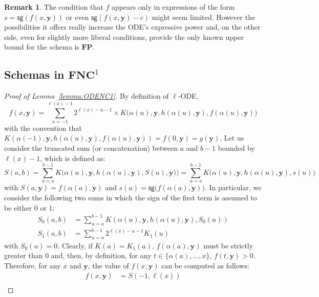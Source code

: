 \documentclass[11pt, oneside]{article}
\newcommand{\fun}[1]{\mathsf{#1}}
\newcommand{\FP}{\mathbf{FP}}
\newcommand{\NC}{\mathbf{FNC}}
\newcommand{\tu}[1]{\mathbf{#1}}
\theoremstyle{definition}
\newtheorem{remark}{Remark}
\begin{document}
\begin{remark}
    The condition that $f$ appears only in expressions of the form $s=\fun{sg}(f(x, \tu y))$ or even  $\fun{sg}(f(x, \tu y)-c)$ might seem limited. However the possibilities it offers really increase the ODE's expressive power and, on the other side, even for slightly more liberal conditions, provide the only known upper bound for the schema is $\FP$. 
\end{remark}








\begin{toappendix}
\subsection{Schemas in $\NC^1$}\label{appendixNC}
\begin{proof}[Proof of Lemma~\ref{lemma:ODENC1}]
    By definition of $\ell$-ODE,
    $$
        f(x, \tu y) = \sum^{\ell(x)-1}_{u=-1} 2^{\ell(x)-u-1} \times K\big(\alpha(u), \tu y, h(\alpha(u), \tu y), f(\alpha(u), \tu y)\big)
    $$
    with the convention that $K(\alpha(-1), \tu y, h(\alpha(u), \tu y), f(\alpha(u), \tu y))=f(0, \tu y)=g(\tu y)$.
    Let us consider the truncated sum (or concatenation) between $a$ and $b-1$ bounded by $\ell(x)-1$, which is defined as:
    $$
    S(a,b) = \sum^{b-1}_{u=a} K\big(\alpha(u), \tu y, h(\alpha(u), \tu y), S(u), \tu y)\big) = \sum^{b-1}_{u=a} K\big(\alpha(u), \tu y, h(\alpha(u), \tu y), s(u)\big)
    $$
    with $S(a, \tu y)=f(\alpha(a), \tu y)$ and $s(a) = \fun{sg}\big(f(\alpha(a), \tu y)\big)$.
    In particular, we consider the following two sums in which the sign of the first term is assumed to be either 0 or 1:
    \begin{align*}
        S_0(a, b) &= \sum^{b-1}_{u=a} K(\alpha(u), \tu y, h(\alpha(u), \tu y), S_0(u)) \\
        S_1(a, b) &= \sum^{b-1}_{u=a} 2^{\ell(x)-u-1} K_1(u)
    \end{align*}
    with $S_0(u)=0$. %
    Clearly, if $K(a)=K_1(a)$, $f(\alpha(a), \tu y)$ must be strictly greater than 0 and, then, by definition, for any $t\in \{\alpha(a),\dots, x\}$, $f(t, \tu y)>0$.
    Therefore, for any $x$ and $\tu y$, the value of $f(x, \tu y)$ can be computed as follows:
    \begin{align*}
        f(x, \tu y) &= S(-1, \ell(x)) \\

\end{align*}
\end{proof}
\end{toappendix}
\end{document}
